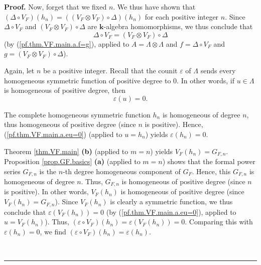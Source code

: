 \documentclass[numbers=enddot,12pt,final,onecolumn,notitlepage]{scrartcl}%
\theoremstyle{definition}
\newenvironment{proof}[1][Proof]{\noindent\textbf{#1.} }{\ \rule{0.5em}{0.5em}}
\newenvironment{verlong}{}{}
\begin{document}
\begin{verlong}
\begin{proof}
Now, forget that we fixed $n$. We thus have shown that \newline$\left(
\Delta\circ V_{F}\right)  \left(  h_{n}\right)  =\left(  \left(  V_{F}\otimes
V_{F}\right)  \circ\Delta\right)  \left(  h_{n}\right)  $ for each positive
integer $n$. Since $\Delta\circ V_{F}$ and $\left(  V_{F}\otimes V_{F}\right)
\circ\Delta$ are $\mathbf{k}$-algebra homomorphisms, we thus conclude that%
\begin{equation}
\Delta\circ V_{F}=\left(  V_{F}\otimes V_{F}\right)  \circ\Delta
\label{pf.thm.VF.main.a.DVF}%
\end{equation}
(by (\ref{pf.thm.VF.main.a.f=g}), applied to $A=\Lambda\otimes\Lambda$ and
$f=\Delta\circ V_{F}$ and $g=\left(  V_{F}\otimes V_{F}\right)  \circ\Delta$).

Again, let $n$ be a positive integer. Recall that the counit $\varepsilon$ of
$\Lambda$ sends every homogeneous symmetric function of positive degree to
$0$. In other words, if $u\in\Lambda$ is homogeneous of positive degree, then%
\begin{equation}
\varepsilon\left(  u\right)  =0. \label{pf.thm.VF.main.a.eu=0}%
\end{equation}


The complete homogeneous symmetric function $h_{n}$ is homogeneous of degree
$n$, thus homogeneous of positive degree (since $n$ is positive). Hence,
(\ref{pf.thm.VF.main.a.eu=0}) (applied to $u=h_{n}$) yields $\varepsilon
\left(  h_{n}\right)  =0$.

Theorem \ref{thm.VF.main} \textbf{(b)} (applied to $m=n$) yields $V_{F}\left(
h_{n}\right)  =G_{F,n}$. Proposition \ref{prop.GF.basics} \textbf{(a)}
(applied to $m=n$) shows that the formal power series $G_{F,n}$ is the $n$-th
degree homogeneous component of $G_{F}$. Hence, this $G_{F,n}$ is homogeneous
of degree $n$. Thus, $G_{F,n}$ is homogeneous of positive degree (since $n$ is
positive). In other words, $V_{F}\left(  h_{n}\right)  $ is homogeneous of
positive degree (since $V_{F}\left(  h_{n}\right)  =G_{F,n}$). Since
$V_{F}\left(  h_{n}\right)  $ is clearly a symmetric function, we thus
conclude that $\varepsilon\left(  V_{F}\left(  h_{n}\right)  \right)  =0$ (by
(\ref{pf.thm.VF.main.a.eu=0}), applied to $u=V_{F}\left(  h_{n}\right)  $).
Thus, $\left(  \varepsilon\circ V_{F}\right)  \left(  h_{n}\right)
=\varepsilon\left(  V_{F}\left(  h_{n}\right)  \right)  =0$. Comparing this
with $\varepsilon\left(  h_{n}\right)  =0$, we find $\left(  \varepsilon\circ
V_{F}\right)  \left(  h_{n}\right)  =\varepsilon\left(  h_{n}\right)  $.


\end{proof}
\end{verlong}
\end{document}
